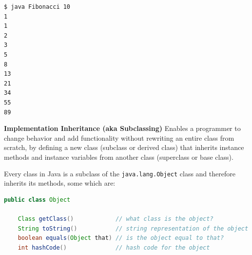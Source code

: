 \documentclass[8pt,a4paper,compress]{beamer}
\begin{document}
\begin{frame}[fragile]
\pause

\begin{lstlisting}[language=bash]
$ java Fibonacci 10
1
1
2
3
5
8
13
21
34
55
89
\end{lstlisting}

\pause
\smallskip

\textbf{Implementation Inheritance (aka Subclassing)} Enables a programmer to change behavior and add functionality without rewriting an entire class from scratch, by defining a new class (subclass or derived class) that inherits instance methods and instance variables from another class (superclass or base class). 

\pause
\smallskip

Every class in Java is a subclass of the \lstinline$java.lang.Object$ class and therefore inherits its methods, some which are:

\begin{lstlisting}[language=Java]
public class Object
    
    Class getClass()            // what class is the object?
    String toString()           // string representation of the object
    boolean equals(Object that) // is the object equal to that?
    int hashCode()              // hash code for the object
\end{lstlisting}

\end{frame}
\end{document}
